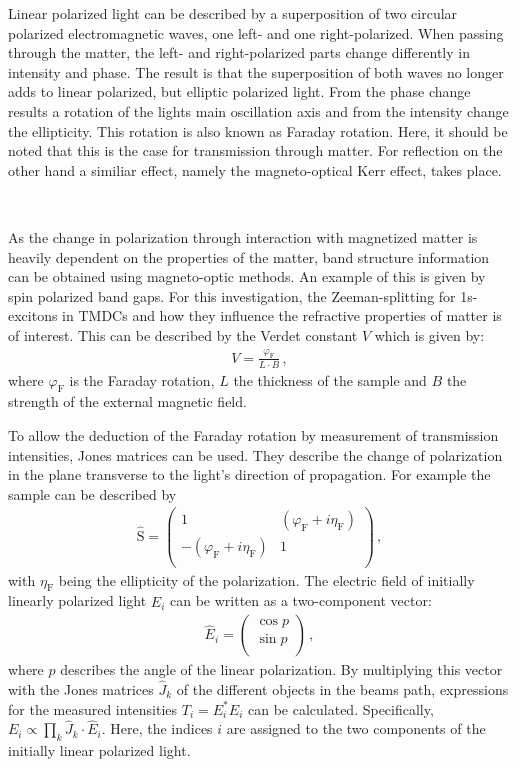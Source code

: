   Linear polarized light can be described by a superposition of two circular polarized electromagnetic waves, one left- and one right-polarized.
	When passing through the matter, the left- and right-polarized parts change differently in intensity and phase.
	The result is that the superposition of both waves no longer adds to linear polarized, but elliptic polarized light.
	From the phase change results a rotation of the lights main oscillation axis and from the intensity change the ellipticity.
	This rotation is also known as Faraday rotation.
	Here, it should be noted that this is the case for transmission through matter.
  For reflection on the other hand a similiar effect, namely the magneto-optical Kerr effect, takes place.

	\

	As the change in polarization through interaction with magnetized matter is heavily dependent on the properties of the matter, band structure information can be obtained using magneto-optic methods.
	An example of this is given by spin polarized band gaps.
	For this investigation, the Zeeman-splitting for 1s-excitons in TMDCs and how they influence the refractive properties of matter is of interest.
	This can be described by the Verdet constant $V$ which is given by:
	\begin{align*}
		V = \frac{\varphi_\text{F}}{L\cdot B} \,,
	\end{align*}
	where $\varphi_\text{F}$ is the Faraday rotation, $L$ the thickness of the sample and $B$ the strength of the external magnetic field.

	To allow the deduction of the Faraday rotation by measurement of transmission intensities, Jones matrices can be used.
	They describe the change of polarization in the plane transverse to the light's direction of propagation.
	For example the sample can be described by
	\begin{align*}
		\hat{\text{S}} = \left( \begin{array}{rr}
		1 & (\varphi_\text{F} + i\eta_\text{F}) \\
		-(\varphi_\text{F} + i\eta_\text{F}) & 1 \\
	\end{array}\right) \,,
	\end{align*}
  with $\eta_\text{F}$ being the ellipticity of the polarization.
	The electric field of initially linearly polarized light $\hat{E}_i$ can be written as a two-component vector:
	\begin{align*}
		\hat{E}_i = \left( \begin{array}{r}
					\cos{p} \\
					\sin{p} \\
				\end{array}\right) \,,
	\end{align*}
	where $p$ describes the angle of the linear polarization.
	By multiplying this vector with the Jones matrices $\hat{J}_k$ of the different objects in the beams path, expressions for the measured intensities $T_i = E_i^* E_i$ can be calculated.
  Specifically, $E_i \propto \prod_k \hat{J}_k \cdot \hat{E}_i$.
  Here, the indices $i$ are assigned to the two components of the initially linear polarized light.

